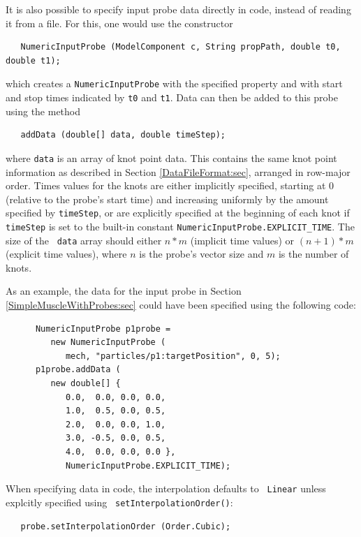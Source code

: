It is also possible to specify input probe data directly in code,
instead of reading it from a file. For this, one would use the
constructor
%
\begin{lstlisting}
   NumericInputProbe (ModelComponent c, String propPath, double t0, double t1);
\end{lstlisting}
%
which creates a {\tt NumericInputProbe} with the specified property
and with start and stop times indicated by {\tt t0} and {\tt t1}.
Data can then be added to this probe using the method
%
\begin{lstlisting}
   addData (double[] data, double timeStep);
\end{lstlisting}
%
where {\tt data} is an array of knot point data. This contains the
same knot point information as described in
Section \ref{DataFileFormat:sec}, arranged in row-major order.
Times values for the knots are either implicitly specified, starting
at 0 (relative to the probe's start time) and increasing uniformly by
the amount specified by {\tt timeStep}, or are explicitly specified at
the beginning of each knot if {\tt timeStep} is set to the built-in
constant {\tt NumericInputProbe.EXPLICIT\_TIME}. The size of the {\tt
data} array should either $n*m$ (implicit time values) or $(n+1)*m$
(explicit time values), where $n$ is the probe's vector size and $m$
is the number of knots.

As an example, the data for the input probe in Section
\ref{SimpleMuscleWithProbes:sec} could have been specified
using the following code:
%
\begin{lstlisting}
      NumericInputProbe p1probe =
         new NumericInputProbe (
            mech, "particles/p1:targetPosition", 0, 5);
      p1probe.addData (
         new double[] {
            0.0,  0.0, 0.0, 0.0,
            1.0,  0.5, 0.0, 0.5,
            2.0,  0.0, 0.0, 1.0,
            3.0, -0.5, 0.0, 0.5,
            4.0,  0.0, 0.0, 0.0 },
            NumericInputProbe.EXPLICIT_TIME);
\end{lstlisting}

When specifying data in code, the interpolation defaults to {\tt
Linear} unless explcitly specified using {\tt
setInterpolationOrder()}:
%
\begin{lstlisting}
   probe.setInterpolationOrder (Order.Cubic);
\end{lstlisting}
%
%
